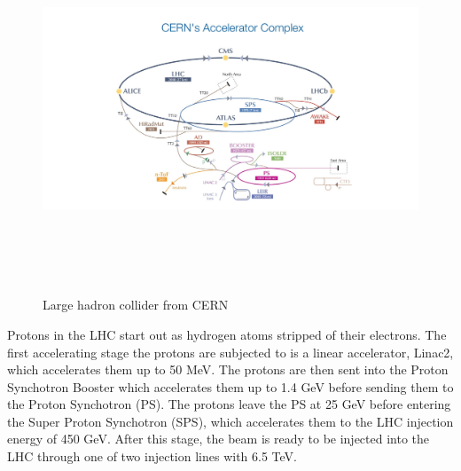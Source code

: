 \pagebreak

\begin{figure}[!htbp]
\centering
\includegraphics[width=17cm,height=11cm]{Chapter1/cern.jpg}
\caption[Large hadron collider from CERN]{Large hadron collider from CERN\cite{cern1}} \label{lhc}
\end{figure}


Protons in the LHC start out as hydrogen atoms stripped of their electrons. The first accelerating stage the protons are subjected to is a linear accelerator, Linac2,
which accelerates them up to 50 MeV. The protons are then sent into the
Proton Synchotron Booster which accelerates them up to 1.4 GeV before sending them to the Proton Synchotron (PS). The protons leave the PS at 25 GeV before entering the Super Proton Synchotron (SPS), which accelerates them to the LHC injection energy of 450 GeV. After this stage, the beam is ready to be injected into
the LHC through one of two injection lines with 6.5 TeV.\cite{cern3}

